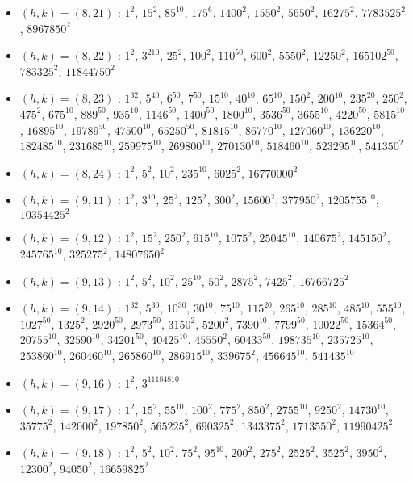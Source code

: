 \begin{itemize}
\item $(h,k)=(8,21)$ : $1^{2}$, $15^{2}$, $85^{10}$, $175^{6}$, $1400^{2}$, $1550^{2}$, $5650^{2}$, $16275^{2}$, $7783525^{2}$, $8967850^{2}$
\item $(h,k)=(8,22)$ : $1^{2}$, $3^{210}$, $25^{2}$, $100^{2}$, $110^{50}$, $600^{2}$, $5550^{2}$, $12250^{2}$, $165102^{50}$, $783325^{2}$, $11844750^{2}$
\item $(h,k)=(8,23)$ : $1^{32}$, $5^{40}$, $6^{50}$, $7^{50}$, $15^{10}$, $40^{10}$, $65^{10}$, $150^{2}$, $200^{10}$, $235^{20}$, $250^{2}$, $475^{2}$, $675^{10}$, $889^{50}$, $935^{10}$, $1146^{50}$, $1400^{50}$, $1800^{10}$, $3536^{50}$, $3655^{10}$, $4220^{50}$, $5815^{10}$, $16895^{10}$, $19789^{50}$, $47500^{10}$, $65250^{50}$, $81815^{10}$, $86770^{10}$, $127060^{10}$, $136220^{10}$, $182485^{10}$, $231685^{10}$, $259975^{10}$, $269800^{10}$, $270130^{10}$, $518460^{10}$, $523295^{10}$, $541350^{2}$
\item $(h,k)=(8,24)$ : $1^{2}$, $5^{2}$, $10^{2}$, $235^{10}$, $6025^{2}$, $16770000^{2}$
\item $(h,k)=(9,11)$ : $1^{2}$, $3^{10}$, $25^{2}$, $125^{2}$, $300^{2}$, $15600^{2}$, $377950^{2}$, $1205755^{10}$, $10354425^{2}$
\item $(h,k)=(9,12)$ : $1^{2}$, $15^{2}$, $250^{2}$, $615^{10}$, $1075^{2}$, $25045^{10}$, $140675^{2}$, $145150^{2}$, $245765^{10}$, $325275^{2}$, $14807650^{2}$
\item $(h,k)=(9,13)$ : $1^{2}$, $5^{2}$, $10^{2}$, $25^{10}$, $50^{2}$, $2875^{2}$, $7425^{2}$, $16766725^{2}$
\item $(h,k)=(9,14)$ : $1^{32}$, $5^{30}$, $10^{30}$, $30^{10}$, $75^{10}$, $115^{20}$, $265^{10}$, $285^{10}$, $485^{10}$, $555^{10}$, $1027^{50}$, $1325^{2}$, $2920^{50}$, $2973^{50}$, $3150^{2}$, $5200^{2}$, $7390^{10}$, $7799^{50}$, $10022^{50}$, $15364^{50}$, $20755^{10}$, $32590^{10}$, $34201^{50}$, $40425^{10}$, $45550^{2}$, $60433^{50}$, $198735^{10}$, $235725^{10}$, $253860^{10}$, $260460^{10}$, $265860^{10}$, $286915^{10}$, $339675^{2}$, $456645^{10}$, $541435^{10}$
\item $(h,k)=(9,16)$ : $1^{2}$, $3^{11184810}$
\item $(h,k)=(9,17)$ : $1^{2}$, $15^{2}$, $55^{10}$, $100^{2}$, $775^{2}$, $850^{2}$, $2755^{10}$, $9250^{2}$, $14730^{10}$, $35775^{2}$, $142000^{2}$, $197850^{2}$, $565225^{2}$, $690325^{2}$, $1343375^{2}$, $1713550^{2}$, $11990425^{2}$
\item $(h,k)=(9,18)$ : $1^{2}$, $5^{2}$, $10^{2}$, $75^{2}$, $95^{10}$, $200^{2}$, $275^{2}$, $2525^{2}$, $3525^{2}$, $3950^{2}$, $12300^{2}$, $94050^{2}$, $16659825^{2}$

\end{itemize}
